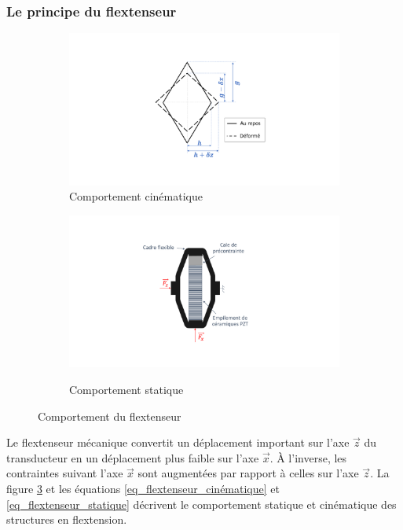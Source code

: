 		\subsubsection{Le principe du flextenseur}
		\label{subsec:2.1.2.a_Le principe du flextenseur}
\begin{figure}[!htbp]
	\begin{center}
		\begin{subfigure}[b]{0.45\textwidth}
			\captionsetup{justification=centering}
			\includegraphics[trim={10.5cm 1cm 9cm 3cm},clip,width=\textwidth]{../Chap2/Figure/flextenseur_cinematique.pdf}
			\caption{ Comportement cinématique}
			\label{fig:flextenseur_cinématique}
		\end{subfigure}
		\begin{subfigure}[b]{0.45\textwidth}
			\captionsetup{justification=centering}
			\includegraphics[trim={9cm 3cm 11.5cm 3cm},clip,width=\textwidth]{../Chap2/Figure/flextenseur_statique.pdf}
			\label{fig:flextenseur_statique}
			\caption{Comportement statique}
		\end{subfigure}
		\caption{Comportement du flextenseur \cite{Zhou2013}}
		\label{fig:flextenseur}
	\end{center}
\end{figure}
Le flextenseur mécanique convertit un déplacement important sur l'axe $\vec{z}$ du transducteur en un déplacement plus faible sur l'axe $\vec{x}$. À l'inverse, les contraintes suivant l'axe $\vec{x}$ sont augmentées par rapport à celles sur l'axe $\vec{z}$. La figure \ref{fig:flextenseur} et les équations \ref{eq_flextenseur_cinématique} et  \ref{eq_flextenseur_statique} décrivent le comportement statique et cinématique des structures en flextension.

